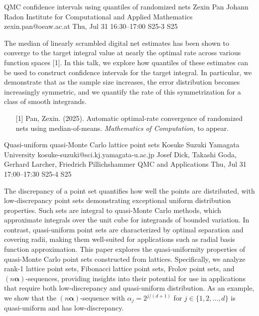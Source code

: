 \begin{talk}
  {QMC confidence intervals using quantiles of randomized nets}%
  {Zexin Pan}%
  {Johann Radon Institute for Computational and Applied Mathematics}%
  {zexin.pan@oeaw.ac.at}%
  {}%
  {}%
  {Thu, Jul 31 16:30–17:00}%
  {S25-3}%
  {S25}%
  {}%
  
				


The median of linearly scrambled digital net estimates has been shown to converge to the target integral value at nearly the optimal rate across various function spaces [1]. In this talk, we explore how quantiles of these estimates can be used to construct confidence intervals for the target integral. In particular, we demonstrate that as the sample size increases, the error distribution becomes increasingly symmetric, and we quantify the rate of this symmetrization for a class of smooth integrands.
            
\medskip


\begin{enumerate}
	\item[{[1]}] Pan, Zexin. (2025). Automatic optimal-rate convergence of randomized nets using median-of-means. {\it  Mathematics of Computation}, to appear.
\end{enumerate}

\end{talk}

\begin{talk}
  {Quasi-uniform quasi-Monte Carlo lattice point sets}%
  {Kosuke Suzuki}%
  {Yamagata University}%
  {kosuke-suzuki@sci.kj.yamagata-u.ac.jp}%
  {Josef Dick, Takashi Goda, Gerhard Larcher, Friedrich Pillichshammer}%
  {QMC and Applications}%
  {Thu, Jul 31 17:00–17:30}%
  {S25-4}%
  {S25}%
				
			

The discrepancy of a point set quantifies how well the points are distributed, with low-discrepancy point sets demonstrating exceptional uniform distribution properties. Such sets are integral to quasi-Monte Carlo methods, which approximate integrals over the unit cube for integrands of bounded variation. In contrast, quasi-uniform point sets are characterized by optimal separation and covering radii, making them well-suited for applications such as radial basis function approximation. This paper explores the quasi-uniformity properties of quasi-Monte Carlo point sets constructed from lattices. Specifically, we analyze rank-1 lattice point sets, Fibonacci lattice point sets, Frolov point sets, and $(n \boldsymbol{\alpha})$-sequences, providing insights into their potential for use in applications that require both low-discrepancy and quasi-uniform distribution. As an example, we show that the $(n \boldsymbol{\alpha})$-sequence with $\alpha_j = 2^{j/(d+1)}$ for $j \in \{1, 2, \ldots, d\}$ is quasi-uniform and has low-discrepancy.


\end{talk}

